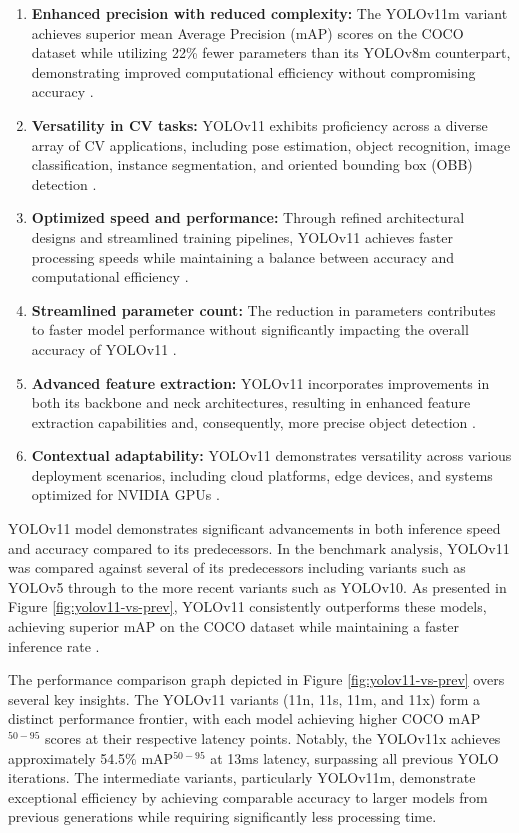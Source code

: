 \documentclass{article}
\begin{document}
\begin{enumerate}
    \item \textbf{Enhanced precision with reduced complexity:} The YOLOv11m variant achieves superior mean Average Precision (mAP) scores on the COCO dataset while utilizing 22\% fewer parameters than its YOLOv8m counterpart, demonstrating improved computational efficiency without compromising accuracy \cite{modelandtasksyolov11}.
    \item \textbf{Versatility in CV tasks:} YOLOv11 exhibits proficiency across a diverse array of CV applications, including pose estimation, object recognition, image classification, instance segmentation, and oriented bounding box (OBB) detection \cite{modelandtasksyolov11}.
    \item \textbf{Optimized speed and performance: }Through refined architectural designs and streamlined training pipelines, YOLOv11 achieves faster processing speeds while maintaining a balance between accuracy and computational efficiency \cite{modelandtasksyolov11}.
    \item \textbf{Streamlined parameter count:} The reduction in parameters contributes to faster model performance without significantly impacting the overall accuracy of YOLOv11 \cite{visoaiyolov11}.
    \item \textbf{Advanced feature extraction:} YOLOv11 incorporates improvements in both its backbone and neck architectures, resulting in enhanced feature extraction capabilities and, consequently, more precise object detection \cite{modelandtasksyolov11}.
    \item \textbf{Contextual adaptability: }YOLOv11 demonstrates versatility across various deployment scenarios, including cloud platforms, edge devices, and systems optimized for NVIDIA GPUs \cite{modelandtasksyolov11}.
\end{enumerate}

YOLOv11 model demonstrates significant advancements in both inference speed and accuracy compared to its predecessors. In the benchmark analysis, YOLOv11 was compared against several of its predecessors including variants such as YOLOv5 \cite{khanam2024yolov5} through to the more recent variants such as YOLOv10. As presented in Figure \ref{fig:yolov11-vs-prev}, YOLOv11 consistently outperforms these models, achieving superior mAP on the COCO dataset while maintaining a faster inference rate \cite{digitalocean_yolov11}.

The performance comparison graph depicted in Figure \ref{fig:yolov11-vs-prev} overs several key insights. The YOLOv11 variants (11n, 11s, 11m, and 11x) form a distinct performance frontier, with each model achieving higher COCO mAP$^{50-95}$ scores at their respective latency points. Notably, the YOLOv11x achieves approximately 54.5\% mAP$^{50-95}$
 at 13ms latency, surpassing all previous YOLO iterations. The intermediate variants, particularly YOLOv11m, demonstrate exceptional efficiency by achieving comparable accuracy to larger models from previous generations while requiring significantly less processing time.
 
\end{document}
